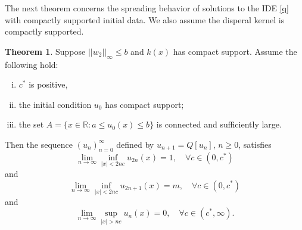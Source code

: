 \documentclass[11pt]{article}
\theoremstyle{definition}
\newtheorem{thm}{Theorem}
\numberwithin{equation}{section}
\numberwithin{thm}{section}
\begin{document}
The next theorem concerns the spreading behavior of solutions to the IDE \eqref{q} with compactly supported initial data. We also assume the disperal kernel is compactly supported.

\begin{thm} Suppose $||w_2||_\infty \leq b$ and $k(x)$ has compact support. Assume the following hold:

\begin{enumerate}[i.)]
\item $c^*$ is positive,\
\item the initial condition $u_0$ has compact support;
\item the set $A=\{x\in\mathbb R:a\leq u_0(x)\leq b\}$  is connected and sufficiently large.
\end{enumerate}
 Then the sequence $(u_n)_{n=0}^{\infty}$ defined by $u_{n+1}=Q[u_n]$, $n\geq 0$, satisfies
\begin{equation}
\lim_{n\to\infty}\inf_{|x|<2nc}u_{2n}(x)=1, \quad \forall c\in(0,c^*)
\end{equation}
and
\begin{equation}
\lim_{n\to\infty}\inf_{|x|<2nc}u_{2n+1}(x)=m, \quad \forall c\in(0,c^*)
\end{equation}
and 
\begin{equation}
\lim_{n\to\infty}\sup_{|x|>nc}u_n(x)=0, \quad \forall c\in(c^*,\infty).
\end{equation}
\end{thm}
\end{document}
